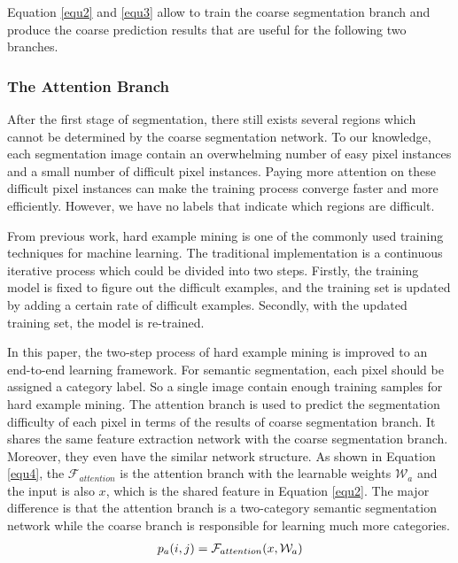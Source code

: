 \documentclass[10.5pt,compsoc]{TsT}
\theoremstyle{mystyle}
\begin{document}
{Equation \ref{equ2} and \ref{equ3} allow to train the coarse segmentation branch and produce the coarse prediction results that are useful for the following two branches.


\subsubsection{The Attention Branch}
\label{s:ab}
\noindent

After the first stage of segmentation, there still exists several regions which cannot be determined by the coarse segmentation network. To our knowledge, each segmentation image contain  an overwhelming number of easy pixel instances and a small number of difficult pixel instances. Paying more attention on these difficult pixel instances can make the training process converge faster and more efficiently. However, we have no labels that indicate which regions are difficult. 

From previous work, hard example mining is one of the commonly used training techniques for machine learning. The traditional implementation is a continuous iterative process which could be divided into two steps. Firstly, the training model is fixed to figure out the difficult examples, and the training set is updated by adding a certain rate of difficult examples. Secondly, with the updated training set, the model is re-trained.

In this paper, the two-step process of hard example mining is improved to an end-to-end learning framework. For semantic segmentation, each pixel should be assigned a category label. So a single image contain enough training samples for hard example mining. The attention branch is used to predict the segmentation difficulty of each pixel in terms of the results of coarse segmentation branch. It shares the same feature extraction network with the coarse segmentation branch. Moreover, they even have the similar network structure.  As shown in Equation \ref{equ4}, the $\mathcal{F}_{attention}$ is the attention branch with the learnable weights $ \mathcal{W}_a$ and the input is also $x$, which is the shared feature in Equation \ref{equ2}. The major difference is that the attention branch is a two-category semantic segmentation network while the coarse branch is responsible for learning much more categories.
\begin{equation}\label{equ4}
\setlength\abovedisplayskip{8pt}
\setlength\belowdisplayskip{8pt}
\begin{split}
p_{a}(i,j) &= \mathcal{F}_{attention}(x, \mathcal{W}_a)\\
\end{split}
\end{equation} 

}
\end{document}
